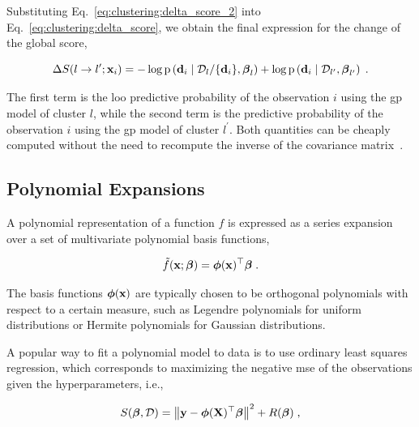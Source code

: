 Substituting Eq.~\eqref{eq:clustering:delta_score_2} into Eq.~\eqref{eq:clustering:delta_score}, we obtain the final expression for the change of the global score,

\begin{equation}
  \Delta S (l \rightarrow l^{\prime}; \mathbf{x}_i) = - \log \mathrm{p} \left( \mathbf{d}_i \mid \mathcal{D}_{l}/\{\mathbf{d}_i\}, \boldsymbol{\beta}_l \right) + \log \mathrm{p} \left( \mathbf{d}_i \mid \mathcal{D}_{l^\prime}, \boldsymbol{\beta}_{l^\prime} \right) \;.
  \label{eq:clustering:delta_score_final}
\end{equation}

The first term is the \gls{loo} predictive probability of the observation $i$ using the \gls{gp} model of cluster $l$, while the second term is the predictive probability of the observation $i$ using the \gls{gp} model of cluster $l^\prime$. Both quantities can be cheaply computed without the need to recompute the inverse of the covariance matrix~\cite{gp_rasmussen}.

\subsection{Polynomial Expansions}
\label{sc:pc_expansions}

A polynomial representation of a function $f$ is expressed as a series expansion over a set of multivariate polynomial basis functions,

\begin{equation}
  \tilde{f}(\mathbf{x}; \boldsymbol{\beta}) = \boldsymbol{\phi}(\mathbf{x})^{\top} \boldsymbol{\beta}\;.
\end{equation}

The basis functions $\boldsymbol{\phi}(\mathbf{x})$ are typically chosen to be orthogonal polynomials with respect to a certain measure, such as Legendre polynomials for uniform distributions or Hermite polynomials for Gaussian distributions. 

\smallskip
A popular way to fit a polynomial model to data is to use ordinary least squares regression, which corresponds to maximizing the negative \gls{mse} of the observations given the hyperparameters, i.e.,

\begin{equation}
  S(\boldsymbol{\beta}, \mathcal{D}) = \left\|\mathbf{y}- \boldsymbol{\phi}(\mathbf{X})^{\top} \boldsymbol{\beta} \right\|^2 + R(\boldsymbol{\beta}) \;,
  \label{eq:clustering:pc_score}
\end{equation}

